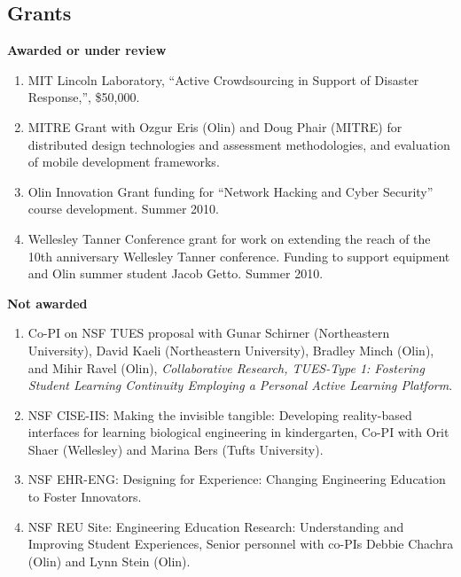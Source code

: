 \documentclass[line]{res}
\begin{document}
\begin{resume}
	\section{\sc Grants}
	
	\textbf{Awarded or under review}
	\begin{enumerate}

		\item MIT Lincoln Laboratory, ``Active Crowdsourcing in Support of Disaster Response,'', \$50,000.

		\item MITRE Grant with Ozgur Eris (Olin) and Doug Phair (MITRE) for distributed design technologies and assessment methodologies, and evaluation of mobile development frameworks.
		
		\item Olin Innovation Grant funding for ``Network Hacking and Cyber Security'' course development. Summer 2010.
		
		\item Wellesley Tanner Conference grant for work on extending the reach of the 10th anniversary Wellesley Tanner conference. Funding to support equipment and Olin summer student Jacob Getto. Summer 2010.
	\end{enumerate}
	
	\textbf{Not awarded} 
	\begin{enumerate}
		\item Co-PI on NSF TUES proposal with Gunar Schirner (Northeastern University), David Kaeli (Northeastern University), Bradley Minch (Olin), and Mihir Ravel (Olin), \textit{Collaborative Research, TUES-Type 1: Fostering Student Learning Continuity Employing a Personal Active Learning Platform}. 
		
		\item NSF CISE-IIS: Making the invisible tangible: Developing reality-based interfaces for learning biological engineering in kindergarten, Co-PI with Orit Shaer (Wellesley) and Marina Bers (Tufts University).
		
		\item NSF EHR-ENG: Designing for Experience: Changing Engineering Education to Foster Innovators.
		
		\item NSF REU Site: Engineering Education Research: Understanding and Improving Student Experiences, Senior personnel with co-PIs Debbie Chachra (Olin) and Lynn Stein (Olin).
		

\end{enumerate}
\end{resume}
\end{document}
